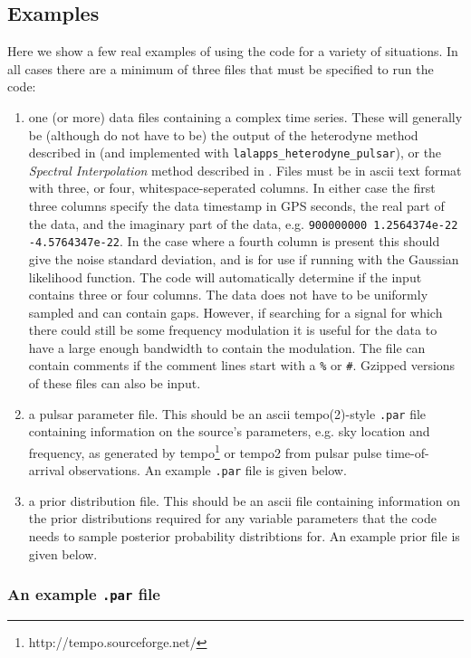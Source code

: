 \subsection{Examples}

Here we show a few real examples of using the code for a variety of situations. In all cases there are a minimum of
three files that must be specified to run the code:
\begin{enumerate}
 \item one (or more) data files containing a complex time series. These will generally be (although do not have to be) the output
 of the heterodyne method described in \citep{2005PhRvD..72j2002D} (and implemented with {\tt lalapps\_heterodyne\_pulsar}), or
 the {\it Spectral Interpolation} method described in \citep{0264-9381-34-1-015010}. Files must be in ascii text format with three, or
 four, whitespace-seperated columns. In either case the first three columns
 specify the data timestamp in GPS seconds, the real part of the data, and the imaginary part of the data, e.g.
 \verb|900000000 1.2564374e-22 -4.5764347e-22|. In the case where a fourth column is present this should give the noise standard
 deviation, and is for use if running with the Gaussian likelihood function. The code will automatically determine if the input
 contains three or four columns. The data does not have to be uniformly sampled and can 
contain gaps. However,
 if searching for a signal for which there could still be some frequency modulation it is useful for the data to have a large
 enough bandwidth to contain the modulation.
 The file can contain comments if the comment lines start with
 a \verb|%| or \verb|#|. Gzipped versions of these files can also be input.
 \item a pulsar parameter file. This should be an ascii {\sc tempo(2)}-style \verb|.par| file containing information on the
 source's parameters, e.g. sky location and frequency, as generated by {\sc tempo}\footnote{http://tempo.sourceforge.net/} or
 {\sc tempo2} \citep{2006MNRAS.369..655H}  from pulsar pulse time-of-arrival observations. An example \verb|.par| file is given below.
 \item a prior distribution file. This should be an ascii file containing information on the prior distributions
 required for any variable parameters that the code needs to sample posterior probability distribtions for. An example
 prior file is given below.
\end{enumerate}

\subsubsection{An example {\tt .par} file}


